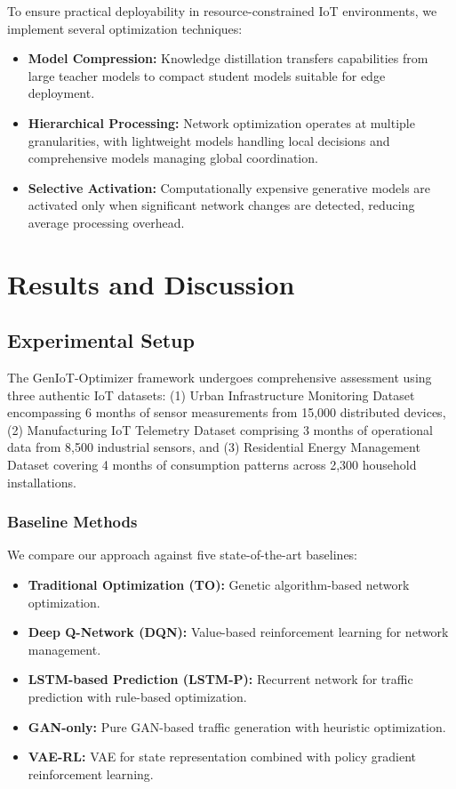 \documentclass[conference]{IEEEtran}
\begin{document}
To ensure practical deployability in resource-constrained IoT environments, we implement several optimization techniques:

\begin{itemize}
\item \textbf{Model Compression:} Knowledge distillation transfers capabilities from large teacher models to compact student models suitable for edge deployment.
\item \textbf{Hierarchical Processing:} Network optimization operates at multiple granularities, with lightweight models handling local decisions and comprehensive models managing global coordination.
\item \textbf{Selective Activation:} Computationally expensive generative models are activated only when significant network changes are detected, reducing average processing overhead.
\end{itemize}

\section{Results and Discussion}

\subsection{Experimental Setup}

The GenIoT-Optimizer framework undergoes comprehensive assessment using three authentic IoT datasets: (1) Urban Infrastructure Monitoring Dataset encompassing 6 months of sensor measurements from 15,000 distributed devices, (2) Manufacturing IoT Telemetry Dataset comprising 3 months of operational data from 8,500 industrial sensors, and (3) Residential Energy Management Dataset covering 4 months of consumption patterns across 2,300 household installations.

\subsubsection{Baseline Methods}

We compare our approach against five state-of-the-art baselines:

\begin{itemize}
\item \textbf{Traditional Optimization (TO):} Genetic algorithm-based network optimization.
\item \textbf{Deep Q-Network (DQN):} Value-based reinforcement learning for network management.
\item \textbf{LSTM-based Prediction (LSTM-P):} Recurrent network for traffic prediction with rule-based optimization.
\item \textbf{GAN-only:} Pure GAN-based traffic generation with heuristic optimization.
\item \textbf{VAE-RL:} VAE for state representation combined with policy gradient reinforcement learning.
\end{itemize}
\end{document}
